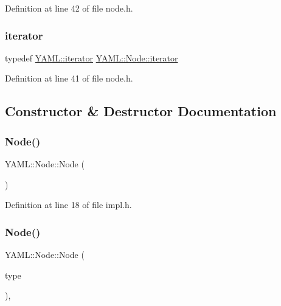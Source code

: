 Definition at line 42 of file node.\+h.

\mbox{\label{class_y_a_m_l_1_1_node_a3004302ddd5d977af0a6da29af38f7f4}} 
\subsubsection{\texorpdfstring{iterator}{iterator}}
{\footnotesize\ttfamily typedef \mbox{\hyperlink{namespace_y_a_m_l_a057e57e7f23a1b85ea32bbc730b94d24}{Y\+A\+M\+L\+::iterator}} \mbox{\hyperlink{class_y_a_m_l_1_1_node_a3004302ddd5d977af0a6da29af38f7f4}{Y\+A\+M\+L\+::\+Node\+::iterator}}}



Definition at line 41 of file node.\+h.



\subsection{Constructor \& Destructor Documentation}
\mbox{\label{class_y_a_m_l_1_1_node_a19cb097351fff40c54c7837d1f84409e}} 
\subsubsection{\texorpdfstring{Node()}{Node()}\hspace{0.1cm}{\footnotesize\ttfamily [1/5]}}
{\footnotesize\ttfamily Y\+A\+M\+L\+::\+Node\+::\+Node (\begin{DoxyParamCaption}{ }\end{DoxyParamCaption})\hspace{0.3cm}{\ttfamily [inline]}}



Definition at line 18 of file impl.\+h.

\mbox{\label{class_y_a_m_l_1_1_node_a4401629dc793878b3527637ed1cc8485}} 
\subsubsection{\texorpdfstring{Node()}{Node()}\hspace{0.1cm}{\footnotesize\ttfamily [2/5]}}
{\footnotesize\ttfamily Y\+A\+M\+L\+::\+Node\+::\+Node (\begin{DoxyParamCaption}\item[{\mbox{\hyperlink{struct_y_a_m_l_1_1_node_type_af83cf3f3c2eca0bf0eae1bbf981e86c4}{Node\+Type\+::value}}}]{type }\end{DoxyParamCaption})\hspace{0.3cm}{\ttfamily [inline]}, {\ttfamily [explicit]}}



